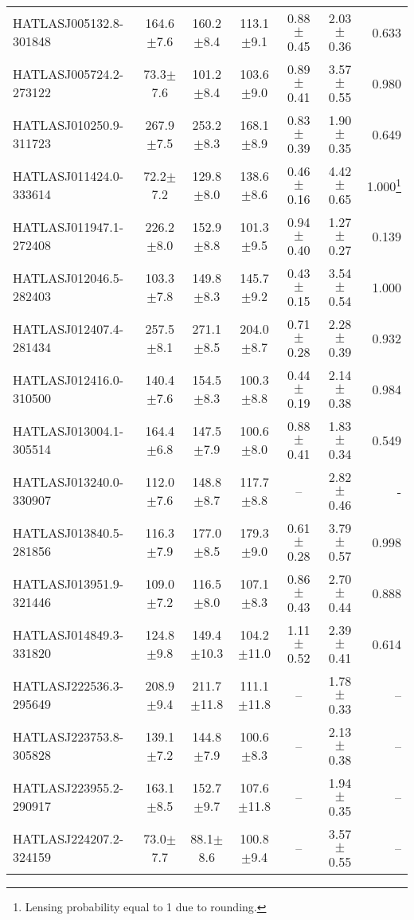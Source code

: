 \begin{landscape}
\begin{longtable}{lcccccr}
    HATLASJ005132.8-301848 & 164.6$\pm$7.6 & 160.2$\pm$8.4 & 113.1$\pm$9.1 & 0.88$\pm$0.45 & 2.03$\pm$0.36 & 0.633 \\
    HATLASJ005724.2-273122 & 73.3$\pm$7.6 & 101.2$\pm$8.4 & 103.6$\pm$9.0 & 0.89$\pm$0.41 & 3.57$\pm$0.55 & 0.980 \\
    HATLASJ010250.9-311723 & 267.9$\pm$7.5 & 253.2$\pm$8.3 & 168.1$\pm$8.9 & 0.83$\pm$0.39 & 1.90$\pm$0.35 & 0.649 \\
    HATLASJ011424.0-333614 & 72.2$\pm$7.2 & 129.8$\pm$8.0 & 138.6$\pm$8.6 & 0.46$\pm$0.16 & 4.42$\pm$0.65 & 1.000\footnote{Lensing probability equal to 1 due to rounding.\label{rounding}} \\
    HATLASJ011947.1-272408 & 226.2$\pm$8.0 & 152.9$\pm$8.8 & 101.3$\pm$9.5 & 0.94$\pm$0.40 & 1.27$\pm$0.27 & 0.139 \\
    HATLASJ012046.5-282403 & 103.3$\pm$7.8 & 149.8$\pm$8.3 & 145.7$\pm$9.2 & 0.43$\pm$0.15 & 3.54$\pm$0.54 & 1.000\footnotemark[1] \\
    HATLASJ012407.4-281434 & 257.5$\pm$8.1 & 271.1$\pm$8.5 & 204.0$\pm$8.7 & 0.71$\pm$0.28 & 2.28$\pm$0.39 & 0.932 \\
    HATLASJ012416.0-310500 & 140.4$\pm$7.6 & 154.5$\pm$8.3 & 100.3$\pm$8.8 & 0.44$\pm$0.19 & 2.14$\pm$0.38 & 0.984 \\
    HATLASJ013004.1-305514 & 164.4$\pm$6.8 & 147.5$\pm$7.9 & 100.6$\pm$8.0 & 0.88$\pm$0.41 & 1.83$\pm$0.34 & 0.549 \\
    HATLASJ013240.0-330907 & 112.0$\pm$7.6 & 148.8$\pm$8.7 & 117.7$\pm$8.8 & -- & 2.82$\pm$0.46 & - \\
    HATLASJ013840.5-281856 & 116.3$\pm$7.9 & 177.0$\pm$8.5 & 179.3$\pm$9.0 & 0.61$\pm$0.28 & 3.79$\pm$0.57 & 0.998 \\
    HATLASJ013951.9-321446 & 109.0$\pm$7.2 & 116.5$\pm$8.0 & 107.1$\pm$8.3 & 0.86$\pm$0.43 & 2.70$\pm$0.44 & 0.888 \\
    HATLASJ014849.3-331820 & 124.8$\pm$9.8 & 149.4$\pm$10.3 & 104.2$\pm$11.0 & 1.11$\pm$0.52 & 2.39$\pm$0.41 & 0.614 \\
    HATLASJ222536.3-295649 & 208.9$\pm$9.4 & 211.7$\pm$11.8 & 111.1$\pm$11.8 & -- & 1.78$\pm$0.33 & -- \\
    HATLASJ223753.8-305828 & 139.1$\pm$7.2 & 144.8$\pm$7.9 & 100.6$\pm$8.3 & -- & 2.13$\pm$0.38 & -- \\
    HATLASJ223955.2-290917 & 163.1$\pm$8.5 & 152.7$\pm$9.7 & 107.6$\pm$11.8 & -- & 1.94$\pm$0.35 & -- \\
    HATLASJ224207.2-324159 & 73.0$\pm$7.7 & 88.1$\pm$8.6 & 100.8$\pm$9.4 & -- & 3.57$\pm$0.55 & -- \\

\end{longtable}
\end{landscape}
